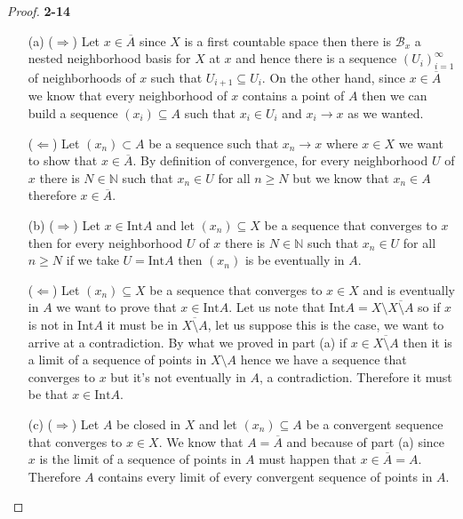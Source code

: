 \documentclass[11pt]{article}
\newcommand{\N}{\mathbb{N}}
\newcommand{\inter}{\text{Int}}
\newcommand{\setmin}{\setminus}
\theoremstyle{definition}
\begin{document}
\begin{proof}{\textbf{2-14}}
\begin{itemize}
    \item [(a)] ($\Rightarrow$) Let $x \in \overline{A}$ since $X$ is a first
    countable space then there is $\mathcal{B}_x$ a nested neighborhood
    basis for $X$ at $x$ and hence there is a sequence $(U_i)_{i=1}^{\infty}$
    of neighborhoods of $x$ such that $U_{i+1} \subseteq U_i$.
    On the other hand, since $x \in \overline{A}$ we know that every
    neighborhood of $x$ contains a point of $A$ then we can build a sequence
    $(x_i) \subseteq A$ such that $x_i \in U_i$ and $x_i \to x$ as we wanted.
    
    ($\Leftarrow$) Let $(x_n) \subset A$ be a sequence such that $x_n \to x$
    where $x \in X$ we want to show that $x \in \overline{A}$. By
    definition of convergence, for every neighborhood $U$ of $x$ there is
    $N \in \N$ such that $x_n \in U$ for all $n \geq N$ but we know that
    $x_n \in A$ therefore $x \in \overline{A}$.

    \item [(b)] ($\Rightarrow$) Let $x \in \inter A$ and let
    $(x_n) \subseteq X$ be a sequence that converges to $x$ then for every
    neighborhood $U$ of $x$ there is $N \in \N$ such that $x_n \in U$ for all
    $n \geq N$ if we take $U = \inter A$ then $(x_n)$ is be eventually in $A$.

    ($\Leftarrow$) Let $(x_n) \subseteq X$ be a sequence that converges to
    $x \in X$ and is eventually in $A$ we want to prove that $x \in \inter A$.
    Let us note that $\inter A = X \setmin \overline{X \setmin A}$ so if $x$
    is not in $\inter A$ it must be in $\overline{X \setmin A}$, let us suppose
    this is the case, we want to arrive at a contradiction.
    By what we proved in part (a) if $x \in \overline{X \setmin A}$ then it is
    a limit of a sequence of points in $X \setmin A$ hence we have a sequence
    that converges to $x$ but it's not eventually in $A$, a contradiction.
    Therefore it must be that $x \in \inter A$.

    \item [(c)] ($\Rightarrow$) Let $A$ be closed in $X$ and let
    $(x_n) \subseteq A$ be a convergent sequence that converges to $x \in X$.
    We know that $A = \overline{A}$ and because of part (a) since $x$ is 
    the limit of a sequence of points in $A$ must happen that
    $x \in \overline{A} = A$. Therefore $A$ contains every limit of every
    convergent sequence of points in $A$.


\end{itemize}
\end{proof}
\end{document}

